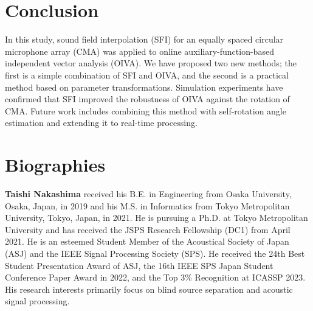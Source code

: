 \documentclass[sip,biber]{now-journal}
\begin{document}
\section{Conclusion}\label{sec:conclusion}
In this study, sound field interpolation (SFI) for an equally spaced circular microphone array (CMA) was applied to online auxiliary-function-based independent vector analysis (OIVA).
We have proposed two new methods; the first is a simple combination of SFI and OIVA, and the second is a practical method based on parameter transformations.
Simulation experiments have confirmed that SFI improved the robustness of OIVA against the rotation of CMA.
Future work includes combining this method with self-rotation angle estimation \cite{Lian:2021:APSIPA} and extending it to real-time processing.

\section*{Biographies}

\noindent\normalsize\textbf{Taishi Nakashima}
received his B.E. in Engineering from Osaka University, Osaka, Japan, in 2019 and his M.S. in Informatics from Tokyo Metropolitan University, Tokyo, Japan, in 2021.
He is pursuing a Ph.D. at Tokyo Metropolitan University and has received the JSPS Research Fellowship (DC1) from April 2021.
He is an esteemed Student Member of the Acoustical Society of Japan (ASJ) and the IEEE Signal Processing Society (SPS).
He received the 24th Best Student Presentation Award of ASJ, the 16th IEEE SPS Japan Student Conference Paper Award in 2022, and the Top 3\% Recognition at ICASSP 2023.
His research interests primarily focus on blind source separation and acoustic signal processing.
\\
\end{document}
